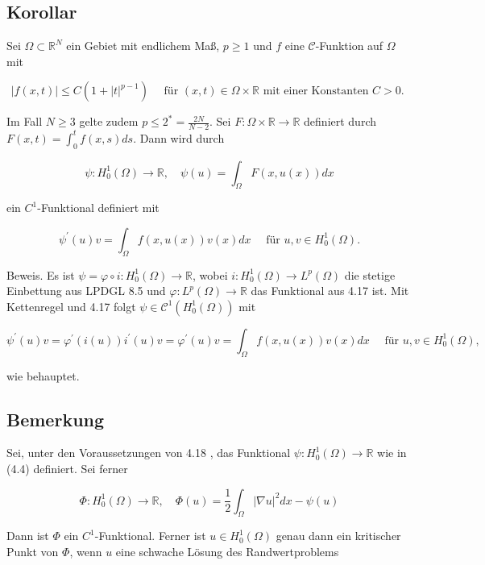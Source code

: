 \documentclass[10pt, letterpaper]{article}
\begin{document}
\subsection*{Korollar}

Sei $\Omega \subset \mathbb{R}^{N}$ ein Gebiet mit endlichem Maß, $p \geq 1$ und $f$ eine $\mathcal{C}$-Funktion auf $\Omega$ mit

$$
|f(x, t)| \leq C\left(1+|t|^{p-1}\right) \quad \text { für }(x, t) \in \Omega \times \mathbb{R} \text { mit einer Konstanten } C>0 \text {. }
$$

Im Fall $N \geq 3$ gelte zudem $p \leq 2^{*}=\frac{2 N}{N-2}$. Sei $F: \Omega \times \mathbb{R} \rightarrow \mathbb{R}$ definiert durch $F(x, t)=\int_{0}^{t} f(x, s) d s$. Dann wird durch

$$
\psi: H_{0}^{1}(\Omega) \rightarrow \mathbb{R}, \quad \psi(u)=\int_{\Omega} F(x, u(x)) d x
$$

ein $C^{1}$-Funktional definiert mit

$$
\psi^{\prime}(u) v=\int_{\Omega} f(x, u(x)) v(x) d x \quad \text { für } u, v \in H_{0}^{1}(\Omega) .
$$

Beweis. Es ist $\psi=\varphi \circ i: H_{0}^{1}(\Omega) \rightarrow \mathbb{R}$, wobei $i: H_{0}^{1}(\Omega) \rightarrow L^{p}(\Omega)$ die stetige Einbettung aus LPDGL 8.5 und $\varphi: L^{p}(\Omega) \rightarrow \mathbb{R}$ das Funktional aus 4.17 ist. Mit Kettenregel und 4.17 folgt $\psi \in \mathcal{C}^{1}\left(H_{0}^{1}(\Omega)\right)$ mit

$$
\psi^{\prime}(u) v=\varphi^{\prime}(i(u)) i^{\prime}(u) v=\varphi^{\prime}(u) v=\int_{\Omega} f(x, u(x)) v(x) d x \quad \text { für } u, v \in H_{0}^{1}(\Omega),
$$

wie behauptet.

\subsection*{Bemerkung}

Sei, unter den Voraussetzungen von 4.18 , das Funktional $\psi: H_{0}^{1}(\Omega) \rightarrow \mathbb{R}$ wie in (4.4) definiert. Sei ferner

$$
\Phi: H_{0}^{1}(\Omega) \rightarrow \mathbb{R}, \quad \Phi(u)=\frac{1}{2} \int_{\Omega}|\nabla u|^{2} d x-\psi(u)
$$

Dann ist $\Phi$ ein $C^{1}$-Funktional. Ferner ist $u \in H_{0}^{1}(\Omega)$ genau dann ein kritischer Punkt von $\Phi$, wenn $u$ eine schwache Lösung des Randwertproblems
\end{document}
